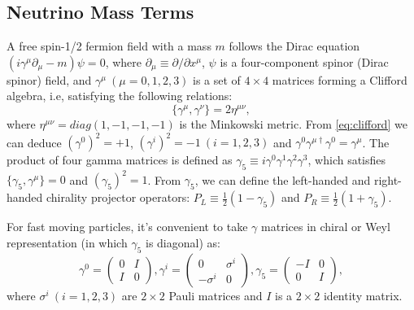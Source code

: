 \subsection{Neutrino Mass Terms}
A free spin-1/2 fermion field with a mass $m$ follows the Dirac equation $(i\gamma^\mu\partial_\mu-m)\psi=0$, where $\partial_\mu\equiv \partial/\partial x^\mu$, $\psi$ is a four-component spinor (Dirac spinor) field, and $\gamma^\mu~(\mu=0,1,2,3)$ is a set of $4\times 4$ matrices forming a Clifford algebra, i.e, satisfying the following relations\cite{akhmedov2014majorana,zee2010quantum}:
\begin{equation}\label{eq:clifford}
\{\gamma^\mu,\gamma^\nu\}=2\eta^{\mu\nu}, 
\end{equation}
where $\eta^{\mu\nu}=diag(1,-1,-1,-1)$ is the Minkowski metric. From \ref{eq:clifford} we can deduce $(\gamma^0)^2=+1$, $(\gamma^i)^2=-1~(i=1,2,3)$ and $\gamma^0\gamma^{\mu\dag}\gamma^0=\gamma^\mu$. The product of four gamma matrices is defined as $\gamma_5\equiv i\gamma^0\gamma^1\gamma^2\gamma^3$, which satisfies $\{\gamma_5,\gamma^\mu\}=0$ and $(\gamma_5)^2=1$. From $\gamma_5$, we can define the left-handed and right-handed chirality projector operators: $P_L\equiv\frac{1}{2}(1-\gamma_5)$ and $P_R\equiv\frac{1}{2}(1+\gamma_5)$.

For fast moving particles, it's convenient to take $\gamma$ matrices in chiral or Weyl representation (in which $\gamma_5$ is diagonal) as\cite{zee2010quantum}:
\begin{equation}
\gamma^0 = \begin{pmatrix} 
0 & I \\
I & 0
\end{pmatrix},
\gamma^i = \begin{pmatrix} 
0 & \sigma^i \\
-\sigma^i & 0
\end{pmatrix},
\gamma_5 = \begin{pmatrix} 
-I & 0 \\
0 & I
\end{pmatrix},
\end{equation}
where $\sigma^i~(i=1,2,3)$ are $2\times 2$ Pauli matrices and $I$ is a $2\times 2$ identity matrix.


